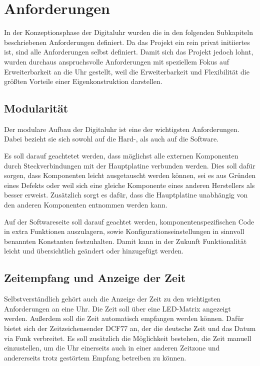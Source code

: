 \section{Anforderungen}
In der Konzeptionsphase der Digitaluhr wurden die in den folgenden Subkapiteln beschriebenen Anforderungen definiert.
Da das Projekt ein rein privat initiiertes ist, sind alle Anforderungen selbst definiert. Damit sich das Projekt jedoch
lohnt, wurden durchaus anspruchsvolle Anforderungen mit speziellem Fokus auf Erweiterbarkeit an die Uhr gestellt, weil die
Erweiterbarkeit und Flexibilität die größten Vorteile einer Eigenkonstruktion darstellen.
%
\subsection{Modularität}
Der modulare Aufbau der Digitaluhr ist eine der wichtigsten Anforderungen. Dabei bezieht sie sich sowohl auf die Hard-,
als auch auf die Software.

Es soll darauf geachtetet werden, dass möglichst alle externen Komponenten durch Steckverbindungen mit der Hauptplatine verbunden werden. 
Dies soll dafür sorgen, dass Komponenten leicht ausgetauscht werden können, sei es aus Gründen eines Defekts oder weil sich eine 
gleiche Komponente eines anderen Herstellers als besser erweist. Zusätzlich sorgt es dafür, dass die Hauptplatine unabhängig
von den anderen Komponenten entnommen werden kann.

Auf der Softwareseite soll darauf geachtet werden, komponentenspezifischen Code in extra Funktionen auszulagern, sowie
Konfigurationseinstellungen in sinnvoll benannten Konstanten festzuhalten. Damit kann in der Zukunft Funktionalität leicht und
übersichtlich geändert oder hinzugefügt werden.
%
\subsection{Zeitempfang und Anzeige der Zeit}
Selbstverständlich gehört auch die Anzeige der Zeit zu den wichtigsten Anforderungen an eine Uhr. Die Zeit soll über eine
LED-Matrix angezeigt werden. Außerdem soll die Zeit automatisch empfangen werden können. Dafür bietet sich der 
Zeitzeichensender DCF77 an, der die deutsche Zeit und das Datum via Funk verbreitet. Es soll zusätzlich die Möglichkeit
bestehen, die Zeit manuell einzustellen, um die Uhr einerseits auch in einer anderen Zeitzone und
andererseits trotz gestörtem Empfang betreiben zu können.

